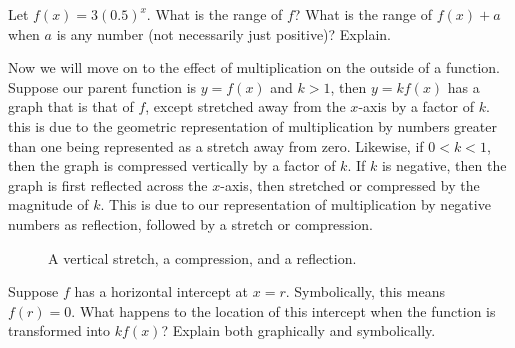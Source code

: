 \begin{question} Let $f(x) = 3(0.5)^x$. What is the range of $f$? What is the range of $f(x) + a$ when $a$ is any number (not necessarily just positive)? Explain.
\end{question}

\par

Now we will move on to the effect of multiplication on the outside of a function. Suppose our parent function is $y=f(x)$ and $k>1$, then $y = kf(x)$ has a graph that is that of $f$, except stretched away from the $x$-axis by a factor of $k$. this is due to the geometric representation of multiplication by numbers greater than one being represented as a stretch away from zero. Likewise, if $0<k<1$, then the graph is compressed vertically by a factor of $k$. If $k$ is negative, then the graph is first reflected across the $x$-axis, then stretched or compressed by the magnitude of $k$. This is due to our representation of multiplication by negative numbers as reflection, followed by a stretch or compression.   

\begin{figure}[h]
\centering
{} 
\caption{A vertical stretch, a compression, and a reflection.}
\end{figure}

\begin{question} Suppose $f$ has a horizontal intercept at $x=r$. Symbolically, this means $f(r) = 0$. What happens to the location of this intercept when the function is transformed into $kf(x)$? Explain both graphically and symbolically.
\end{question}


